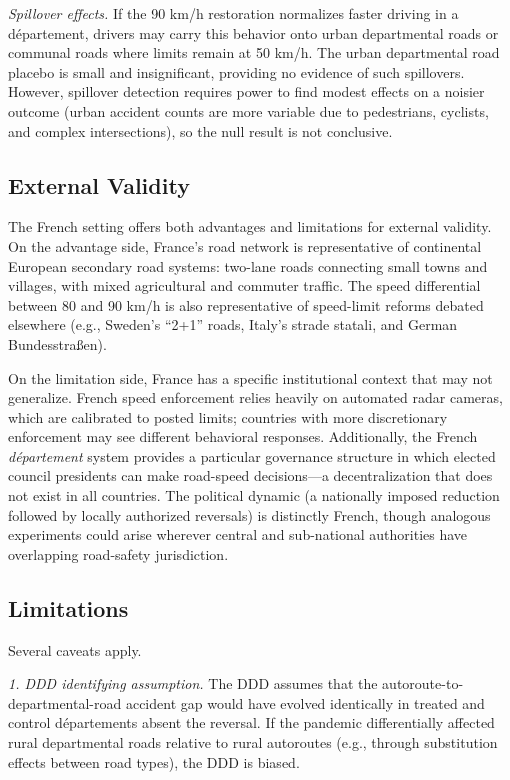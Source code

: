 \documentclass[12pt]{article}
\begin{document}
\textit{Spillover effects.} If the 90 km/h restoration normalizes faster driving in a d\'{e}partement, drivers may carry this behavior onto urban departmental roads or communal roads where limits remain at 50 km/h. The urban departmental road placebo is small and insignificant, providing no evidence of such spillovers. However, spillover detection requires power to find modest effects on a noisier outcome (urban accident counts are more variable due to pedestrians, cyclists, and complex intersections), so the null result is not conclusive.

\subsection{External Validity}

The French setting offers both advantages and limitations for external validity. On the advantage side, France's road network is representative of continental European secondary road systems: two-lane roads connecting small towns and villages, with mixed agricultural and commuter traffic. The speed differential between 80 and 90 km/h is also representative of speed-limit reforms debated elsewhere (e.g., Sweden's ``2+1'' roads, Italy's strade statali, and German Bundesstra\ss en).

On the limitation side, France has a specific institutional context that may not generalize. French speed enforcement relies heavily on automated radar cameras, which are calibrated to posted limits; countries with more discretionary enforcement may see different behavioral responses. Additionally, the French \textit{d\'{e}partement} system provides a particular governance structure in which elected council presidents can make road-speed decisions---a decentralization that does not exist in all countries. The political dynamic (a nationally imposed reduction followed by locally authorized reversals) is distinctly French, though analogous experiments could arise wherever central and sub-national authorities have overlapping road-safety jurisdiction.

\subsection{Limitations}

Several caveats apply.

\textit{1. DDD identifying assumption.} The DDD assumes that the autoroute-to-departmental-road accident gap would have evolved identically in treated and control d\'{e}partements absent the reversal. If the pandemic differentially affected rural departmental roads relative to rural autoroutes (e.g., through substitution effects between road types), the DDD is biased.
\end{document}
